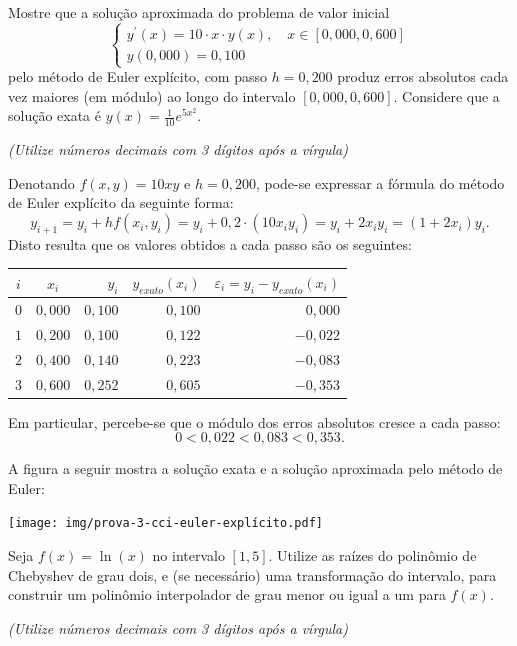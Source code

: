 \documentclass[12pt,a4paper]{article}
\begin{document}
\begin{ExerciseList}
\Exercise[title={2,0}] Mostre que a solução aproximada do problema de valor inicial
\[
\begin{cases}
y^\prime(x) = 10\cdot x \cdot y(x) , \quad x \in [0,000, 0,600]\\
y(0,000) = 0,100
\end{cases}
\]
pelo método de Euler explícito, com passo $h=0,200$ produz erros absolutos cada vez maiores (em módulo) ao longo do intervalo $[0,000, 0,600]$. Considere que a solução exata é $y(x) = \frac{1}{10}e^{5x^2}$.

{\color{blue} \textit{(Utilize números decimais com 3 dígitos após a vírgula)}}

\Answer Denotando $f(x,y) = 10 x y$ e $h=0,200$, pode-se expressar a fórmula do método de Euler explícito da seguinte forma:
\[
y_{i+1}
= y_{i} + h f(x_{i}, y_{i})
= y_{i} + 0,2 \cdot \left( 10 x_{i} y_{i} \right)
= y_{i} + 2 x_{i} y_{i}
= (1 + 2x_{i}) y_{i}.
\]
Disto resulta que os valores obtidos a cada passo são os seguintes:

\medskip
\begin{center}
\begin{tabular}{ccrrr}
\hline
$i$ & $x_i$ & $y_i$ & $y_{exato}(x_i)$ & $\varepsilon_i = y_i-y_{exato}(x_i)$ \\ \hline
$0$ & $0,000$ & $0,100$ & $0,100$ & $ 0,000$ \\
$1$ & $0,200$ & $0,100$ & $0,122$ & $-0,022$ \\
$2$ & $0,400$ & $0,140$ & $0,223$ & $-0,083$ \\
$3$ & $0,600$ & $0,252$ & $0,605$ & $-0,353$ \\ \hline
\end{tabular}
\end{center}
\medskip
Em particular, percebe-se que o módulo dos erros absolutos cresce a cada passo:
\[
0 < 0,022 < 0,083 < 0,353.
\]

A figura a seguir mostra a solução exata e a solução aproximada pelo método de Euler:
\medskip
\begin{center}
\texttt{[image: img/prova-3-cci-euler-explícito.pdf]}
\end{center}


\Exercise[title={2,0}] Seja $f(x) = \ln(x)$ no intervalo $[1, 5]$. Utilize as raízes do polinômio de Chebyshev de grau dois, e (se necessário) uma transformação do intervalo, para construir um polinômio interpolador de grau menor ou igual a um para $f(x)$.

{\color{blue} \textit{(Utilize números decimais com 3 dígitos após a vírgula)}}



\end{ExerciseList}
\end{document}
